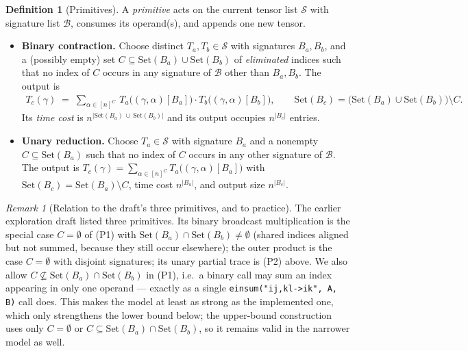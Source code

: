 \documentclass[11pt]{article}
\newcommand{\calB}{\mathcal{B}}
\newcommand{\calS}{\mathcal{S}}
\newcommand{\takesetp}[1]{\mathrm{Set}(#1)}
\theoremstyle{plain}
\theoremstyle{definition}
\newtheorem{definition}{Definition}
\theoremstyle{remark}
\newtheorem{remark}{Remark}
\begin{document}
\begin{definition}[Primitives]
\label{def:primitives}
A \emph{primitive} acts on the current tensor list $\calS$ with signature
list $\calB$, consumes its operand(s), and appends one new tensor.
\begin{itemize}
\item[\textbf{(P1)}] \textbf{Binary contraction.}  Choose distinct
$T_a, T_b \in \calS$ with signatures $B_a, B_b$, and a (possibly empty)
set $C \subseteq \takesetp{B_a} \cup \takesetp{B_b}$ of \emph{eliminated}
indices such that no index of $C$ occurs in any signature of
$\calB$ other than $B_a, B_b$.  The output is
\begin{align*}
   T_c(\gamma) \;=\; \sum_{\alpha \in [n]^{C}}\,
   T_a\bigl((\gamma,\alpha)[B_a]\bigr)\cdot
   T_b\bigl((\gamma,\alpha)[B_b]\bigr),
   \qquad
   \takesetp{B_c} = \bigl(\takesetp{B_a}\cup\takesetp{B_b}\bigr)\setminus C .
\end{align*}
Its \emph{time cost} is $n^{|\takesetp{B_a}\,\cup\,\takesetp{B_b}|}$ and its
output occupies $n^{|B_c|}$ entries.
\item[\textbf{(P2)}] \textbf{Unary reduction.}  Choose $T_a \in \calS$
with signature $B_a$ and a nonempty $C \subseteq \takesetp{B_a}$ such that
no index of $C$ occurs in any other signature of $\calB$.  The output is
$T_c(\gamma) = \sum_{\alpha\in[n]^C} T_a\bigl((\gamma,\alpha)[B_a]\bigr)$
with $\takesetp{B_c} = \takesetp{B_a}\setminus C$, time cost
$n^{|B_a|}$, and output size $n^{|B_c|}$.
\end{itemize}
\end{definition}

\begin{remark}[Relation to the draft's three primitives, and to practice]
\label{rem:naming}
The earlier exploration draft listed three primitives.  Its binary
broadcast multiplication is the special case $C=\emptyset$ of (P1) with
$\takesetp{B_a}\cap\takesetp{B_b}\neq\emptyset$ (shared indices aligned but
not summed, because they still occur elsewhere); the outer product is the
case $C=\emptyset$ with disjoint signatures; its unary partial trace is
(P2) above.  We also allow $C \not\subseteq
\takesetp{B_a}\cap\takesetp{B_b}$ in (P1), i.e.\ a binary call may sum an
index appearing in only one operand --- exactly as a single
\texttt{einsum("ij,kl->ik",\,A,\,B)} call does.  This makes the model at
least as strong as the implemented one, which only strengthens the lower
bound below; the upper-bound construction uses only $C=\emptyset$ or
$C \subseteq \takesetp{B_a}\cap\takesetp{B_b}$, so it remains valid in the
narrower model as well.
\end{remark}
\end{document}
